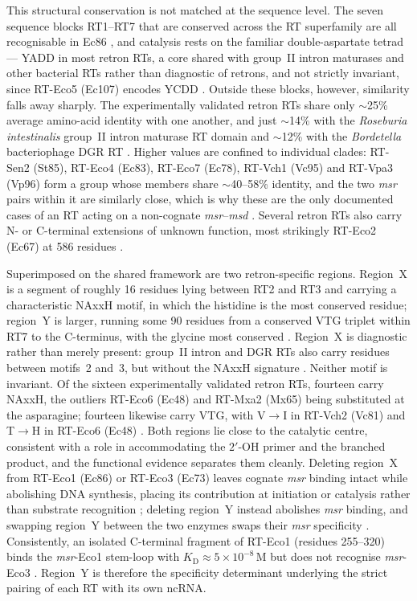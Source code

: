 This structural conservation is not matched at the sequence level. The seven
sequence blocks RT1--RT7 that are conserved across the RT superfamily are all
recognisable in Ec86 \cite{simon2019,wang2022}, and catalysis rests on the
familiar double-aspartate tetrad --- YADD in most retron RTs, a core shared with
group~II intron maturases and other bacterial RTs rather than diagnostic of
retrons, and not strictly invariant, since RT-Eco5 (Ec107) encodes YCDD
\cite{simon2019}. Outside these blocks, however, similarity falls away sharply.
The experimentally validated retron RTs share only $\sim$25\% average amino-acid
identity with one another, and just $\sim$14\% with the \textit{Roseburia
intestinalis} group~II intron maturase RT domain and $\sim$12\% with the
\textit{Bordetella} bacteriophage DGR RT \cite{simon2019}. Higher values are
confined to individual clades: RT-Sen2 (St85), RT-Eco4 (Ec83), RT-Eco7 (Ec78),
RT-Vch1 (Vc95) and RT-Vpa3 (Vp96) form a group whose members share
$\sim$40--58\% identity, and the two \textit{msr} pairs within it are similarly
close, which is why these are the only documented cases of an RT acting on a
non-cognate \textit{msr}--\textit{msd} \cite{simon2019}. Several retron RTs also
carry N- or C-terminal extensions of unknown function, most strikingly RT-Eco2
(Ec67) at 586 residues \cite{simon2019}.

Superimposed on the shared framework are two retron-specific regions.
Region~X is a segment of roughly 16 residues lying between RT2 and RT3 and
carrying a characteristic NAxxH motif, in which the histidine is the most
conserved residue; region~Y is larger, running some 90 residues from a conserved
VTG triplet within RT7 to the C-terminus, with the glycine most conserved
\cite{simon2019,mestre2020}. Region~X is diagnostic rather than merely present:
group~II intron and DGR RTs also carry residues between motifs~2 and~3, but
without the NAxxH signature \cite{simon2019}. Neither motif is invariant. Of the
sixteen experimentally validated retron RTs, fourteen carry NAxxH, the outliers
RT-Eco6 (Ec48) and RT-Mxa2 (Mx65) being substituted at the asparagine; fourteen
likewise carry VTG, with V$\rightarrow$I in RT-Vch2 (Vc81) and T$\rightarrow$H
in RT-Eco6 (Ec48) \cite{simon2019}. Both regions lie close to the catalytic
centre, consistent with a role in accommodating the $2'$-OH primer and the
branched product, and the functional evidence separates them cleanly. Deleting
region~X from RT-Eco1 (Ec86) or RT-Eco3 (Ec73) leaves cognate \textit{msr}
binding intact while abolishing DNA synthesis, placing its contribution at
initiation or catalysis rather than substrate recognition \cite{inouye1999};
deleting region~Y instead abolishes \textit{msr} binding, and swapping region~Y
between the two enzymes swaps their \textit{msr} specificity \cite{inouye1999}.
Consistently, an isolated C-terminal fragment of RT-Eco1 (residues 255--320)
binds the \textit{msr}-Eco1 stem-loop with $K_{\mathrm{D}} \approx
5\times10^{-8}$\,M but does not recognise \textit{msr}-Eco3 \cite{inouye2004}.
Region~Y is therefore the specificity determinant underlying the strict pairing
of each RT with its own ncRNA.

